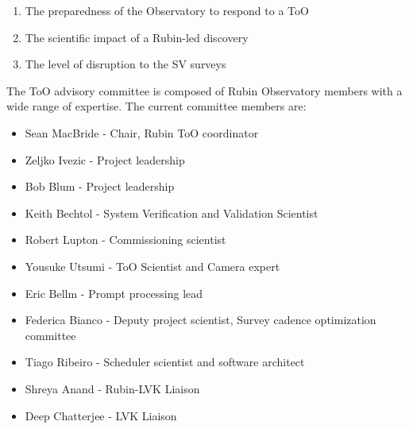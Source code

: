 \begin{enumerate}
    \item The preparedness of the Observatory to respond to a ToO
    \item The scientific impact of a Rubin-led discovery
    \item The level of disruption to the SV surveys
\end{enumerate}

The ToO advisory committee is composed of Rubin Observatory members with a wide range of expertise. The current committee members are:

\begin{itemize}

    \item Sean MacBride - Chair, Rubin ToO coordinator
    \item Zeljko Ivezic - Project leadership
    \item Bob Blum - Project leadership
    \item Keith Bechtol - System Verification and Validation Scientist
    \item Robert Lupton - Commissioning scientist
    \item Yousuke Utsumi - ToO Scientist and Camera expert
    \item Eric Bellm - Prompt processing lead
    \item Federica Bianco - Deputy project scientist, Survey cadence optimization committee
    \item Tiago Ribeiro - Scheduler scientist and software architect
    \item Shreya Anand - Rubin-LVK Liaison
    \item Deep Chatterjee - LVK Liaison
\end{itemize}